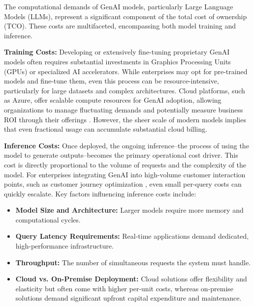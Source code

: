 \documentclass[10pt,twocolumn,letterpaper]{article}
\begin{document}
The computational demands of GenAI models, particularly Large Language Models (LLMs), represent a significant component of the total cost of ownership (TCO). These costs are multifaceted, encompassing both model training and inference.

\textbf{Training Costs:} Developing or extensively fine-tuning proprietary GenAI models often requires substantial investments in Graphics Processing Units (GPUs) or specialized AI accelerators. While enterprises may opt for pre-trained models and fine-tune them, even this process can be resource-intensive, particularly for large datasets and complex architectures. Cloud platforms, such as Azure, offer scalable compute resources for GenAI adoption, allowing organizations to manage fluctuating demands and potentially measure business ROI through their offerings \cite{openalex_w7138188291}. However, the sheer scale of modern models implies that even fractional usage can accumulate substantial cloud billing.

\textbf{Inference Costs:} Once deployed, the ongoing inference--the process of using the model to generate outputs--becomes the primary operational cost driver. This cost is directly proportional to the volume of requests and the complexity of the model. For enterprises integrating GenAI into high-volume customer interaction points, such as customer journey optimization \cite{openalex_w4400993506}, even small per-query costs can quickly escalate. Key factors influencing inference costs include:
\begin{itemize}
  \item \textbf{Model Size and Architecture:} Larger models require more memory and computational cycles.
  \item \textbf{Query Latency Requirements:} Real-time applications demand dedicated, high-performance infrastructure.
  \item \textbf{Throughput:} The number of simultaneous requests the system must handle.
  \item \textbf{Cloud vs. On-Premise Deployment:} Cloud solutions offer flexibility and elasticity but often come with higher per-unit costs, whereas on-premise solutions demand significant upfront capital expenditure and maintenance.
\end{itemize}
\end{document}
